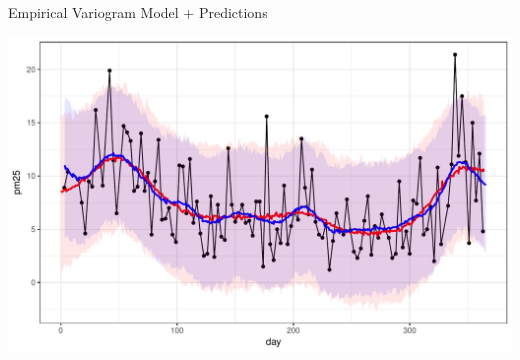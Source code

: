\documentclass[11pt,ignorenonframetext,]{beamer}
\begin{document}
\begin{frame}{Empirical Variogram Model + Predictions}

\includegraphics{Lec13_files/figure-beamer/unnamed-chunk-25-1.pdf}

\end{frame}
\end{document}
